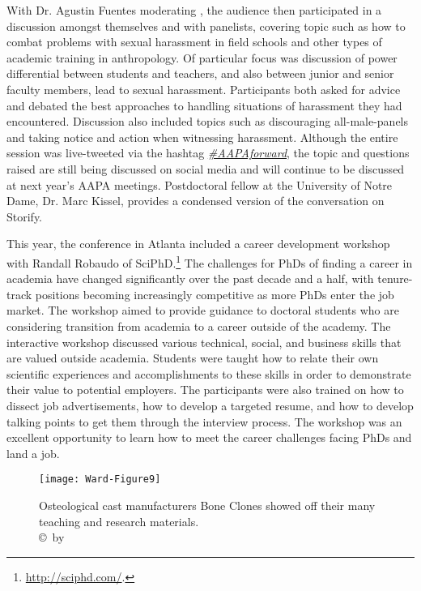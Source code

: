 \documentclass[english]{ijsra}
\begin{document}
With Dr. Agustin Fuentes moderating , the audience then participated in a discussion amongst themselves and with panelists,
covering topic such as how to combat problems with sexual harassment in field schools and 
other types of academic training in anthropology. 
Of particular focus was discussion of power differential between students and teachers,
and also between junior and senior faculty members, lead to sexual harassment. 
Participants both asked for advice and debated the best approaches to handling situations of harassment they had encountered.
Discussion also included topics such as discouraging all-male-panels and taking notice and action when witnessing harassment.
Although the entire session was live-tweeted via the hashtag \href{LINK}{\emph{\#AAPAforward}}, %
the topic and questions raised are still being discussed on social media and will continue to
be discussed at next year’s AAPA meetings. 
Postdoctoral fellow at the University of Notre Dame, Dr. Marc Kissel, provides a condensed version of the conversation on Storify. %

This year, the conference in Atlanta included a career development workshop with Randall Robaudo of SciPhD.\footnote{\href{http://sciphd.com/}{http://sciphd.com/}.} %
The challenges for PhDs of finding a career in academia have changed significantly over the past decade and a half,
with tenure-track positions becoming increasingly competitive as more PhDs enter the job market. 
The workshop aimed to provide guidance to doctoral students who are considering transition from academia to
a career outside of the academy. 
The interactive workshop discussed various technical, social, and business skills that are valued outside academia.
Students were taught how to relate their own scientific experiences and accomplishments to these skills in order to
demonstrate their value to potential employers. 
The participants were also trained on how to dissect job advertisements, how to develop a targeted resume,
and how to develop talking points to get them through the interview process. 
The workshop was an excellent opportunity to learn how to meet the career challenges facing PhDs and land a job.

	\begin{figure}[!tb] %
		\centering
		\texttt{[image: Ward-Figure9]}
		\caption{Osteological cast manufacturers Bone Clones showed off their many teaching and research materials.
				{\normalfont\scriptsize \\ \copyright\ by \shortauthor}}
		\label{fig:Ward-Figure9}
	\end{figure}
	
\end{document}
